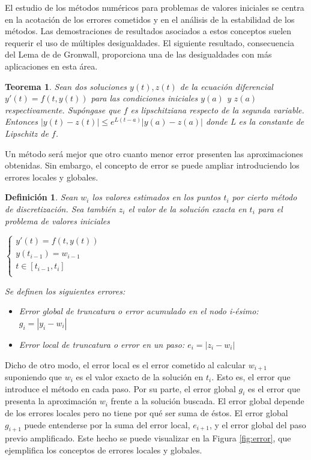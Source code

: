 \documentclass{article}
\theoremstyle{theorem-style}  %
\newtheorem{theorem}{Teorema}[section]  %
\theoremstyle{definition-style}
\newtheorem{definition}{Definición}[section]
\theoremstyle{example-style}
\begin{document}
	El estudio de los métodos numéricos para problemas de valores iniciales se centra en la acotación de los errores cometidos y en el análisis de la estabilidad de los métodos. Las demostraciones de resultados asociados a estos conceptos suelen requerir el uso de múltiples desigualdades. El siguiente resultado, consecuencia del Lema de de Gronwall, proporciona una de las desigualdades con más aplicaciones en esta área.

	\begin{theorem} \label{theorem:desigualdad-sols}
		Sean dos soluciones $y(t), z(t)$ de la ecuación diferencial $y'(t) = f(t,y(t))$ para las condiciones iniciales $y(a)$ y $z(a)$ respectivamente. Supóngase que $f$ es lipschitziana respecto de la segunda variable. Entonces $|y(t)-z(t)| \leq e^{L(t-a)}|y(a)-z(a)|$ donde L es la constante de Lipschitz de $f$.
	\end{theorem}

	Un método será mejor que otro cuanto menor error presenten las aproximaciones obtenidas. Sin embargo, el concepto de error se puede ampliar introduciendo los errores locales y globales.

	\begin{definition}
		Sean $w_i$ los valores estimados en los puntos $t_i$ por cierto método de discretización. Sea también $z_i$ el valor de la solución exacta en $t_i$ para el problema de valores iniciales

		\begin{center}
			$\begin{cases}
			y'(t) = f(t,y(t)) \\
			y(t_{i-1}) = w_{i-1} \\
			t \in [t_{i-1},t_{i}] \\
			\end{cases}$
		\end{center}

		Se definen los siguientes errores:

		\begin{itemize}
			\item Error global de truncatura o error acumulado en el nodo i-ésimo: $g_i=|y_i - w_i|$
			\item Error local de truncatura o error en un paso: $e_i = |z_i - w_i|$
		\end{itemize}
	\end{definition}

	Dicho de otro modo, el error local es el error cometido al calcular $w_{i+1}$ suponiendo que $w_i$ es el valor exacto de la solución en $t_i$. Esto es, el error que introduce el método en cada paso. Por su parte, el error global $g_i$ es el error que presenta la aproximación $w_i$ frente a la solución buscada. El error global depende de los errores locales pero no tiene por qué ser suma de éstos. El error global $g_{i+1}$ puede entenderse por la suma del error local, $e_{i+1}$, y el error global del paso previo amplificado. Este hecho se puede visualizar en la Figura \ref{fig:error}, que ejemplifica los conceptos de errores locales y globales.
\end{document}
